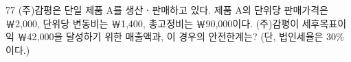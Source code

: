 \begin{question}{77}
(주)감평은 단일 제품 A를 생산ㆍ판매하고 있다. 제품 A의 단위당 판매가격은 ￦2,000, 단위당 변동비는 ￦1,400, 총고정비는 ￦90,000이다. (주)감평이 세후목표이익 ￦42,000을 달성하기 위한 매출액과, 이 경우의 안전한계는? (단, 법인세율은 30\%이다.)
{\par\noindent\hspace*{2em}\par}
\begin{choices}
  \item {}
  \item {}
  \item {}
  \item {}
  \item {}
\end{choices}
\end{question}
